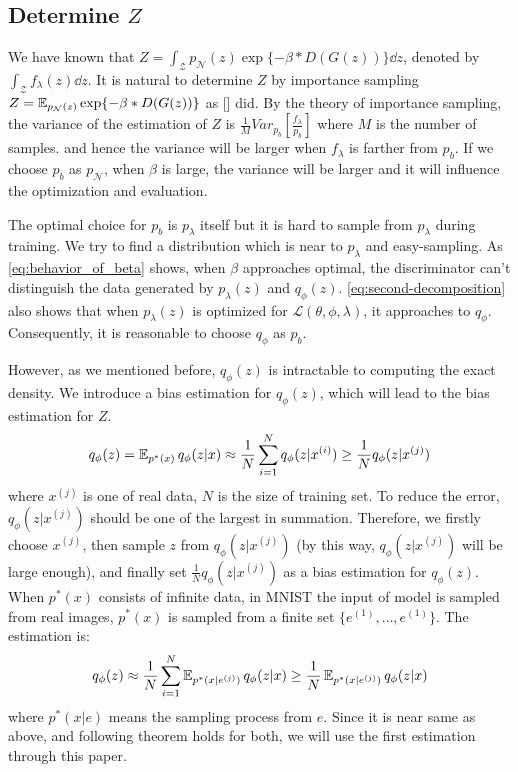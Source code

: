 \subsection{Determine $Z$}

We have known that $Z = \int_{\mathcal{Z}} p_\mathcal{N}(z) \exp\{- \beta * D(G(z))\} \dd z$, denoted by $\int_{\mathcal{Z}} f_\lambda(z) \dd z$. It is natural to determine $Z$ by importance sampling $Z = \operatorname{\mathbb{E}}_{p_\mathcal{N}(z)} \exp\{- \beta * D(G(z))\}$ as [] did. By the theory of importance sampling, the variance of the estimation of $Z$ is $\frac{1}{M} Var_{p_b}[\frac{f_\lambda}{p_b}]$ where $M$ is the number of samples. and hence the variance will be larger when $f_\lambda$ is farther from $p_b$. If we choose $p_b$ as $p_\mathcal{N}$, when $\beta$ is large, the variance will be larger and it will influence the optimization and evaluation. 

The optimal choice for $p_b$ is $p_\lambda$ itself but it is hard to sample from $p_\lambda$ during training. We try to find a distribution which is near to $p_\lambda$ and easy-sampling. As \cref{eq:behavior_of_beta} shows, when $\beta$ approaches optimal, the discriminator can't distinguish the data generated by $p_\lambda(z)$ and $q_\phi(z)$.  \cref{eq:second-decomposition} also shows that when $p_\lambda(z)$ is optimized for $\mathcal{L}(\theta, \phi, \lambda)$, it approaches to $q_\phi$. Consequently, it is reasonable to choose $q_\phi$ as $p_b$. 

However, as we mentioned before, $q_\phi(z)$ is intractable to computing the exact density. We introduce a bias estimation for $q_\phi(z)$, which will lead to the bias estimation for $Z$. 
\begin{equation*}
	q_\phi(z) = \operatorname{\mathbb{E}}_{p^*(x)} q_\phi(z|x) \approx \frac{1}{N}\sum_{i=1}^N q_\phi(z|x^{(i)}) \geq \frac{1}{N} q_\phi(z|x^{(j)})
\end{equation*}
where $x^{(j)}$ is one of real data, $N$ is the size of training set. To reduce the error, $q_\phi(z|x^{(j)})$ should be one of the largest in summation. Therefore, we firstly choose $x^{(j)}$, then sample $z$ from $q_\phi(z|x^{(j)})$ (by this way, $q_\phi(z|x^{(j)})$ will be large enough), and finally set $\frac{1}{N} q_\phi(z|x^{(j)})$ as a bias estimation for $q_\phi(z)$. When $p^*(x)$ consists of infinite data, \EG in MNIST the input of model is sampled from real images, $p^*(x)$ is sampled from a finite set $\{e^{(1)}, \ldots, e^{(1)}\}$. The estimation is:
\begin{equation*}
	q_\phi(z) \approx \frac{1}{N}\sum_{i=1}^N \operatorname{\mathbb{E}}_{p^*(x|e^{(j)})} q_\phi(z|x) \geq \frac{1}{N} \operatorname{\mathbb{E}}_{p^*(x|e^{(j)})} q_\phi(z|x)
\end{equation*} 
where $p^*(x|e)$ means the sampling process from $e$. Since it is near same as above, and following theorem holds for both, we will use the first estimation through this paper. 

